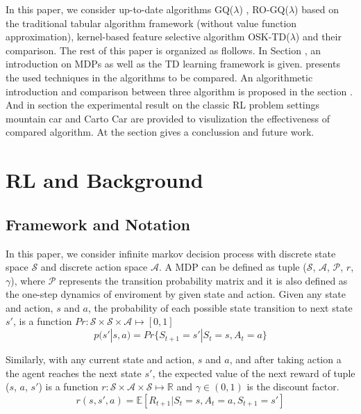 \documentclass[conference]{IEEEtran}
\begin{document}
In this paper, we consider up-to-date algorithms GQ($\lambda$) \cite{maei2010gq}, RO-GQ($\lambda$) \cite{liu2012regularized} based on the traditional tabular algorithm framework (without value function approximation), kernel-based feature selective algorithm OSK-TD($\lambda$) \cite{chen2013online} and their comparison. The rest of this paper is organized as flollows. In Section \uppercase\expandafter{}, an introduction on MDPs as well as the TD learning framework is given. \uppercase\expandafter{} presents the used techniques in the algorithms to be compared. An algorithmetic introduction and comparison between three algorithm is proposed in the section \uppercase\expandafter{}. And in section \uppercase\expandafter{} the experimental result on the classic RL problem settings mountain car and Carto Car are provided to visulization the effectiveness of compared algorithm. At the \uppercase\expandafter{} section gives a conclussion and future work.\\

\section{RL and Background}
\subsection{Framework and Notation}
In this paper, we consider infinite markov decision process with discrete state space $\mathcal{S}$ and discrete action space $\mathcal{A}$. A  MDP can be defined as tuple ($\mathcal{S}$, $\mathcal{A}$, $\mathcal{P}$, $r$, $\gamma$), where $\mathcal{P}$ represents the transition probability matrix and it is also defined as the one-step dynamics of enviroment by given state and action. \cite{sutton1998reinforcement} Given any state and action, $s$ and $a$, the probability of each possible state transition to next state $s'$, is a function $Pr:\mathcal{S}\times\mathcal{S}\times\mathcal{A}\mapsto[0, 1]$
\begin{equation}
  p(s'|s, a)=Pr\{S_{t+1}=s'|S_t=s,A_t=a\}
\end{equation}


Similarly, with any current state and action, $s$ and $a$, and after taking action a the agent reaches the next state $s'$, the expected value of the next reward of tuple ($s$, $a$, $s'$) is a function $r:\mathcal{S}\times\mathcal{A}\times\mathcal{S}\mapsto\mathbb{R}$ and $\gamma\in(0, 1)$ is the discount factor.
\begin{equation}
  r(s, s', a)=\mathbb{E}[R_{t+1}|S_t=s,A_t=a, S_{t+1}=s']
\end{equation}
\end{document}
